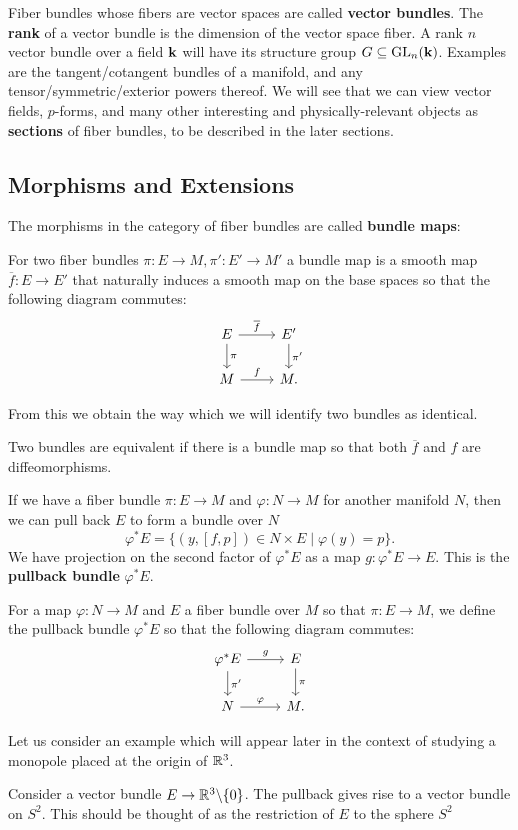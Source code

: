 		Fiber bundles whose fibers are vector spaces are called \textbf{vector bundles}. The \textbf{rank} of a vector bundle is the dimension of the vector space fiber. A rank $n$ vector bundle over a field $\mathbf{k}$ will have its structure group $G \subseteq \mathrm{GL}_n(\mathbf{k})$. Examples are the tangent/cotangent bundles of a manifold, and any tensor/symmetric/exterior powers thereof. We will see that we can view vector fields, $p$-forms, and many other interesting and physically-relevant objects as \textbf{sections} of fiber bundles, to be described in the later sections.
		
		\subsection{Morphisms and Extensions}
		The morphisms in the category of fiber bundles are called \textbf{bundle maps}:
		
		\begin{defn}
			For two fiber bundles $\pi: E \rightarrow M, \pi': E' \rightarrow M'$ a bundle map is a smooth map $\overline f: E \rightarrow E'$ that naturally induces a smooth map on the base spaces so that the following diagram commutes:
			\[
			\begin{tikzcd}
			E \arrow{r}{\overline f} \arrow{d}{\pi} & E' \arrow{d}{\pi'} \\
			M \arrow{r}{f} & M.
			\end{tikzcd}
			\]
		\end{defn}
		From this we obtain the way which we will identify two bundles as identical.
		\begin{defn}
			Two bundles are equivalent if there is a bundle map so that both $\overline f$ and $f$ are diffeomorphisms. 
		\end{defn}
		If we have a fiber bundle $\pi: E \rightarrow M$ and $\varphi: N \rightarrow M$ for another manifold $N$, then we can pull back $E$ to form a bundle over $N$
		\begin{equation}
			\varphi^* E = \{(y,[f,p]) \in N \times E \mid \varphi(y) = p \}.
		\end{equation}
		We have projection on the second factor of $\varphi^* E$ as a map $g: \varphi^* E \rightarrow E$. 
		This is the \textbf{pullback bundle} $\varphi^* E$.
		\begin{defn}
			For a map $\varphi: N \rightarrow M$ and $E$ a fiber bundle over $M$ so that $\pi: E \rightarrow M$, we define the pullback bundle $\varphi^* E$ so that the following diagram commutes:
			\[
			\begin{tikzcd}
			\varphi^* E \arrow{r}{g} \arrow{d}{\pi'} & E \arrow{d}{\pi} \\
			N \arrow{r}{\varphi} & M.
			\end{tikzcd}
			\]
		\end{defn}
		Let us consider an example which will appear later in the context of studying a monopole placed at the origin of $\mathbb{R}^3$.
		\begin{eg}
			Consider a vector bundle $E  \to \mathbb{R}^3 \backslash \{0\}$. The pullback  gives rise to a vector bundle on $S^2$. This should be thought of as the restriction of $E$ to the sphere $S^2$
		\end{eg}
		
